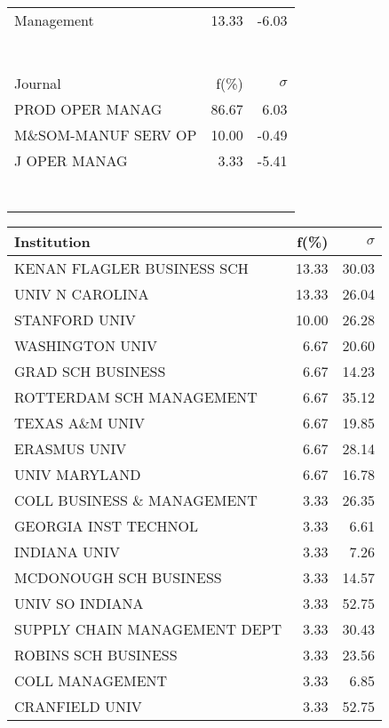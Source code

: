 \documentclass[a4paper,11pt]{report}
\begin{document}
\begin{landscape}
\begin{table}[!ht]
{\begin{tabular}{|l r  r|}
Management & 13.33 & -6.03\\
 &  & \\
 &  & \\
 &  & \\
 &  & \\
 &  & \\
 &  & \\
 &  & \\
\hline
\hline
Journal & f(\%) & $\sigma$\\
\hline
PROD OPER MANAG & 86.67 & 6.03\\
M\&SOM-MANUF SERV OP & 10.00 & -0.49\\
J OPER MANAG & 3.33 & -5.41\\
 &  & \\
 &  & \\
 &  & \\
 &  & \\
 &  & \\
 &  & \\
 &  & \\
\hline
\end{tabular}
}
{\scriptsize\begin{tabular}{|l r r|}
\hline
Institution & f(\%) & $\sigma$\\
\hline
KENAN FLAGLER BUSINESS SCH & 13.33 & 30.03\\
UNIV N CAROLINA & 13.33 & 26.04\\
STANFORD UNIV & 10.00 & 26.28\\
WASHINGTON UNIV & 6.67 & 20.60\\
GRAD SCH BUSINESS & 6.67 & 14.23\\
ROTTERDAM SCH MANAGEMENT & 6.67 & 35.12\\
TEXAS A\&M UNIV & 6.67 & 19.85\\
ERASMUS UNIV & 6.67 & 28.14\\
UNIV MARYLAND & 6.67 & 16.78\\
COLL BUSINESS \& MANAGEMENT & 3.33 & 26.35\\
GEORGIA INST TECHNOL & 3.33 & 6.61\\
INDIANA UNIV & 3.33 & 7.26\\
MCDONOUGH SCH BUSINESS & 3.33 & 14.57\\
UNIV SO INDIANA & 3.33 & 52.75\\
SUPPLY CHAIN MANAGEMENT DEPT & 3.33 & 30.43\\
ROBINS SCH BUSINESS & 3.33 & 23.56\\
COLL MANAGEMENT & 3.33 & 6.85\\
CRANFIELD UNIV & 3.33 & 52.75\\

\end{tabular}}
\end{table}
\end{landscape}
\end{document}
